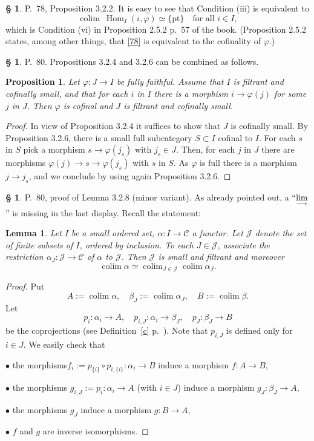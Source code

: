 \documentclass[12pt]{article}
\newtheorem{lem}[thm]{Lemma}
\newtheorem{prop}[thm]{Proposition}
\theoremstyle{remark}
\theoremstyle{definition}
\newtheorem{s}[thm]{\S}
\newcommand{\bu}{\bullet}
\newcommand{\cc}{\mathcal}
\newcommand{\C}{\mathcal C}
\newcommand{\pt}{\{\text{pt}\}}
\newcommand{\mv}{ (minor variant)}
\newcommand{\colim}{\operatornamewithlimits{\underset{\longrightarrow}{lim}}}
\DeclareMathOperator*{\coli}{colim}
\DeclareMathOperator*{\co}{colim}
\DeclareMathOperator{\Hom}{Hom}%
\begin{document}
%
%
\begin{s} 
P.~78, Proposition 3.2.2. It is easy to see that Condition (iii) is equivalent to
%
\begin{equation}\label{78} 
\co\ \Hom_I(i,\varphi)\simeq\pt\quad\text{for all }i\in I, 
\end{equation} 
%
which is Condition (vi) in Proposition 2.5.2 p.~57 of the book. (Proposition 2.5.2 states, among other things, that \eqref{78} is equivalent to the cofinality of $\varphi$.)
\end{s}
%
%
\begin{s} 
P.~80. Propositions 3.2.4 and 3.2.6 can be combined as follows. 

\begin{prop}\label{comb}
Let $\varphi:J\to I$ be fully faithful. Assume that $I$ is filtrant and cofinally small, and that for each $i$ in $I$ there is a morphism $i\to\varphi(j)$ for some $j$ in $J$. Then $\varphi$ is cofinal and $J$ is filtrant and cofinally small. 
\end{prop} 

\begin{proof}
In view of Proposition 3.2.4 it suffices to show that $J$ is cofinally small. By Proposition 3.2.6, there is a small full subcategory $S\subset I$ cofinal to $I$. For each $s$ in $S$ pick a morphism $s\to\varphi(j_s)$ with $j_s\in J$. Then, for each $j$ in $J$ there are morphisms $\varphi(j)\to s\to\varphi(j_s)$ with $s$ in $S$. As $\varphi$ is full there is a morphism $j\to j_s$, and we conclude by using again Proposition 3.2.6.
\end{proof}
\end{s}
%
%
\begin{s} 
P.~80, proof of Lemma 3.2.8\mv. As already pointed out, a ``$\displaystyle\colim$'' is missing in the last display. Recall the statement:
\begin{lem}
Let $I$ be a small ordered set, $\alpha:I\to\C$ a functor. Let $\cc J$ denote the set of finite subsets of $I$, ordered by inclusion. To each $J\in\cc J$, associate the restriction $\alpha_J:\cc J\to\C$ of $\alpha$ to $\cc J$. Then $\cc J$ is small and filtrant and moreover
$$
\co\alpha\simeq\co_{J\in\cc J}\co\alpha_J.
$$
\end{lem}
\begin{proof}
Put
$$
A:=\coli\alpha,\quad
\beta_J:=\coli\alpha_J,\quad
B:=\coli\beta.
$$
Let 
$$
p_i:\alpha_i\to A,\quad 
p_{i,J}:\alpha_i\to\beta_J,\quad 
p_J:\beta_J\to B
$$
be the coprojections (see Definition~\ref{c} p.~\pageref{c}). Note that $p_{i,J}$ is defined only for $i\in J$. We easily check that 

\noindent$\bu$ the morphisms$f_i:=p_{\{i\}}\circ p_{i,\{i\}}:\alpha_i\to B$ induce a morphism $f:A\to B$, 

\noindent$\bu$ the morphisms $g_{i,J}:=p_i:\alpha_i\to A$ (with $i\in J$) induce a morphism $g_J:\beta_J\to A$, 

\noindent$\bu$ the morphisms $g_J$ induce a morphism $g:B\to A$, 

\noindent$\bu$ $f$ and $g$ are inverse isomorphisms.
\end{proof}
\end{s}
\end{document}
